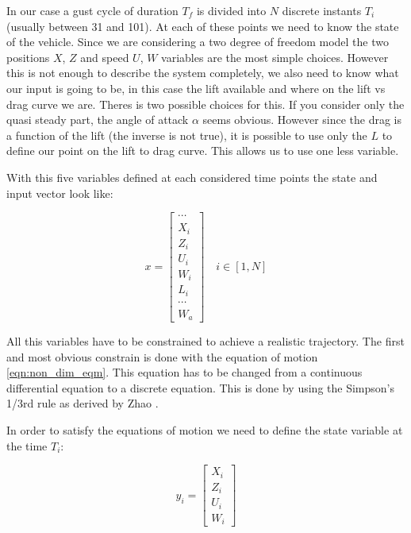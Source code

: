\par In our case a gust cycle of duration $T_f$ is divided into $N$ discrete instants $T_i$ (usually between 31 and 101).
At each of these points we need to know the state of the vehicle.
Since we are considering a two degree of freedom model the two positions $X$, $Z$ and speed $U$, $W$ variables are the most simple choices.
However this is not enough to describe the system completely, we also need to know what our input is going to be, in this case the lift available and where on the lift vs drag curve we are.
Theres is two possible choices for this.
If you consider only the quasi steady part, the angle of attack $\alpha$ seems obvious.
However since the drag is a function of the lift (the inverse is not true), it is possible to use only the $L$ to define our point on the lift to drag curve.
This allows us to use one less variable.

\par With this five variables defined at each considered time points the state and input vector look like:

\begin{equation}
	x= 
	\begin{bmatrix}
		\cdots \\
		X_i \\
		Z_i \\
		U_i \\
		W_i \\
		L_i \\
		\cdots \\
		W_a
	\end{bmatrix}
	\quad i \in [1,N]
	\label{eqn:big_vector}
\end{equation}

\par All this variables have to be constrained to achieve a realistic trajectory.
The first and most obvious constrain is done with the equation of motion \ref{eqn:non_dim_eqm}.
This equation has to be changed from a continuous differential equation to a discrete equation.
This is done by using the Simpson's 1/3rd rule as derived by Zhao \cite{zhao2004optimal}.

In order to satisfy the equations of motion we need to define the state variable at the time $T_i$:

\begin{equation}
	y_i= \begin{bmatrix}
		X_i \\
		Z_i \\
		U_i \\
		W_i 
	\end{bmatrix}
	\label{eqn:state_i}
\end{equation}

